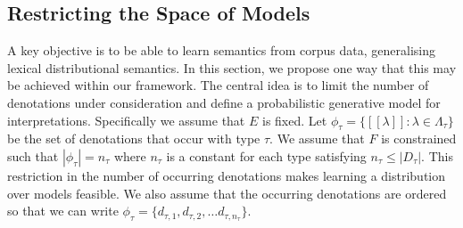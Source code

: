 \documentclass[11pt]{article}
\theoremstyle{definition}
\newcommand{\interp}[1]{[\![ #1 ]\!]}
\begin{document}



 
\subsection{Restricting the Space of Models}
\label{section:distributions}

A key objective is to be able to learn semantics from corpus data,
generalising lexical distributional semantics. In this section, we
propose one way that this may be achieved within our framework. The
central idea is to limit the number of denotations under
consideration and define a probabilistic generative model for
interpretations. Specifically we assume that $E$ is fixed. Let
$\phi_\tau = \{\interp{\lambda} : \lambda\in \Lambda_\tau\}$
be the set of denotations that occur with type $\tau$. We assume that
$F$ is constrained such that $|\phi_\tau| = n_\tau$ where $n_\tau$
is a constant for each type satisfying $n_\tau \le |D_\tau|$. This
restriction in the number of occurring denotations makes learning a
distribution over models feasible. We also assume that the occurring
denotations are ordered so that we can write $\phi_\tau =
\{d_{\tau,1}, d_{\tau,2}, \ldots d_{\tau, n_\tau}\}$.
\end{document}
